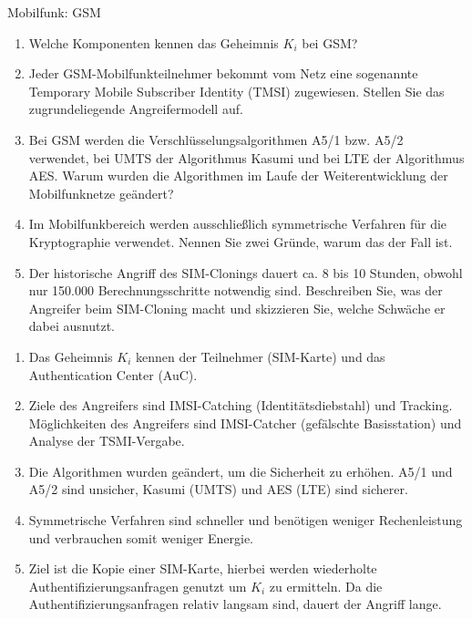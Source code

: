 \documentclass{article}
\begin{document}
\begin{exercise}{Mobilfunk: GSM}
  \begin{enumerate}
    \item Welche Komponenten kennen das Geheimnis $K_i$ bei GSM?
    \item Jeder GSM-Mobilfunkteilnehmer bekommt vom Netz eine sogenannte Temporary Mobile Subscriber Identity (TMSI) zugewiesen. Stellen Sie das zugrundeliegende Angreifermodell auf.
    \item Bei GSM werden die Verschlüsselungsalgorithmen A5/1 bzw. A5/2 verwendet, bei UMTS der Algorithmus Kasumi und bei LTE der Algorithmus AES. Warum wurden die Algorithmen im Laufe der Weiterentwicklung der Mobilfunknetze geändert?
    \item Im Mobilfunkbereich werden ausschließlich symmetrische Verfahren für die Kryptographie verwendet. Nennen Sie zwei Gründe, warum das der Fall ist.
    \item Der historische Angriff des SIM-Clonings dauert ca. 8 bis 10 Stunden, obwohl nur 150.000 Berechnungsschritte notwendig sind. Beschreiben Sie, was der Angreifer beim SIM-Cloning macht und skizzieren Sie, welche Schwäche er dabei ausnutzt.
  \end{enumerate}

  \begin{solution}
    \begin{enumerate}
      \item Das Geheimnis $K_i$ kennen der Teilnehmer (SIM-Karte) und das Authentication Center (AuC).
      \item Ziele des Angreifers sind IMSI-Catching (Identitätsdiebstahl) und Tracking. Möglichkeiten des Angreifers sind IMSI-Catcher (gefälschte Basisstation) und Analyse der TSMI-Vergabe.
      \item Die Algorithmen wurden geändert, um die Sicherheit zu erhöhen. A5/1 und A5/2 sind unsicher, Kasumi (UMTS) und AES (LTE) sind sicherer.
      \item Symmetrische Verfahren sind schneller und benötigen weniger Rechenleistung und verbrauchen somit weniger Energie.
      \item Ziel ist die Kopie einer SIM-Karte, hierbei werden wiederholte Authentifizierungsanfragen genutzt um $K_i$ zu ermitteln. Da die Authentifizierungsanfragen relativ langsam sind, dauert der Angriff lange.
    \end{enumerate}
  \end{solution}
\end{exercise}
\end{document}
